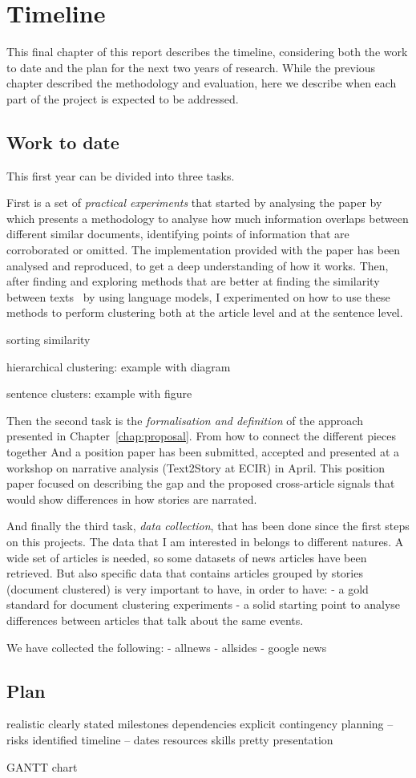 \chapter{Timeline}
\label{chap:plan}

This final chapter of this report describes the timeline, considering both the work to date and the plan for the next two years of research.
While the previous chapter described the methodology and evaluation, here we describe when each part of the project is expected to be addressed.

\section{Work to date}

This first year can be divided into three tasks.


First is a set of \emph{practical experiments} that started by analysing the paper by~\citet{bountouridis2018explaining} which presents a methodology to analyse how much information overlaps between different similar documents, identifying points of information that are corroborated or omitted.
The implementation provided with the paper has been analysed and reproduced, to get a deep understanding of how it works.
Then, after finding and exploring methods that are better at finding the similarity between texts~\cite{cer2018universal,devlin2018bert,yang2019xlnet} by using language models, I experimented on how to use these methods to perform clustering both at the article level and at the sentence level.


sorting similarity

hierarchical clustering: example with diagram

sentence clusters: example with figure


Then the second task is the \emph{formalisation and definition} of the approach presented in Chapter~\ref{chap:proposal}.
From how to connect the different pieces together
And a position paper has been submitted, accepted and presented at a workshop on narrative analysis (Text2Story at ECIR) in April.
This position paper focused on describing the gap and the proposed cross-article signals that would show differences in how stories are narrated.


And finally the third task, \emph{data collection}, that has been done since the first steps on this projects.
The data that I am interested in belongs to different natures.
A wide set of articles is needed, so some datasets of news articles have been retrieved.
But also specific data that contains articles grouped by stories (document clustered) is very important to have, in order to have:
- a gold standard for document clustering experiments
- a solid starting point to analyse differences between articles that talk about the same events.

We have collected the following:
- allnews
- allsides
- google news

\section{Plan}

realistic
clearly stated milestones
dependencies explicit
contingency planning – risks identified
timeline – dates
resources
skills
pretty presentation

GANTT chart

